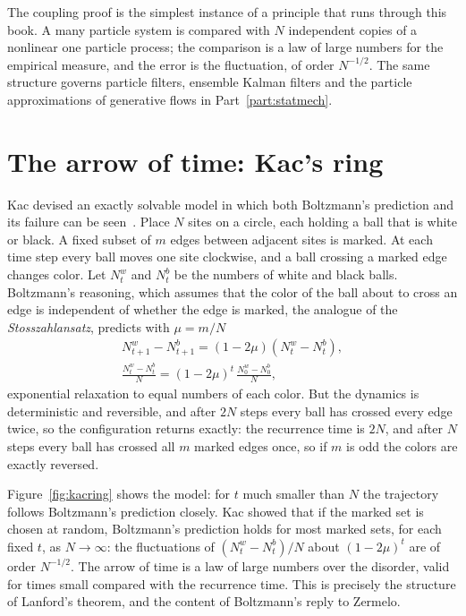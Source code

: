 The coupling proof is the simplest instance of a principle that runs through this book. A many particle system is compared with $N$ independent copies of a nonlinear one particle process; the comparison is a law of large numbers for the empirical measure, and the error is the fluctuation, of order $N^{-1/2}$. The same structure governs particle filters, ensemble Kalman filters and the particle approximations of generative flows in Part~\ref{part:statmech}.

\section{The arrow of time: Kac's ring}

Kac devised an exactly solvable model in which both Boltzmann's prediction and its failure can be seen~\cite{kac1959}. Place $N$ sites on a circle, each holding a ball that is white or black. A fixed subset of $m$ edges between adjacent sites is marked. At each time step every ball moves one site clockwise, and a ball crossing a marked edge changes color. Let $N^w_t$ and $N^b_t$ be the numbers of white and black balls. Boltzmann's reasoning, which assumes that the color of the ball about to cross an edge is independent of whether the edge is marked, the analogue of the \emph{Stosszahlansatz}, predicts with $\mu = m/N$
\begin{gather*}
N^w_{t+1}-N^b_{t+1} = (1-2\mu)(N^w_t-N^b_t), \\
\frac{N^w_t-N^b_t}{N} = (1-2\mu)^t\,\frac{N^w_0-N^b_0}{N},
\end{gather*}
exponential relaxation to equal numbers of each color. But the dynamics is deterministic and reversible, and after $2N$ steps every ball has crossed every edge twice, so the configuration returns exactly: the recurrence time is $2N$, and after $N$ steps every ball has crossed all $m$ marked edges once, so if $m$ is odd the colors are exactly reversed.

Figure~\ref{fig:kacring} shows the model: for $t$ much smaller than $N$ the trajectory follows Boltzmann's prediction closely. Kac showed that if the marked set is chosen at random, Boltzmann's prediction holds for most marked sets, for each fixed $t$, as $N\to\infty$: the fluctuations of $(N^w_t-N^b_t)/N$ about $(1-2\mu)^t$ are of order $N^{-1/2}$. The arrow of time is a law of large numbers over the disorder, valid for times small compared with the recurrence time. This is precisely the structure of Lanford's theorem, and the content of Boltzmann's reply to Zermelo.

